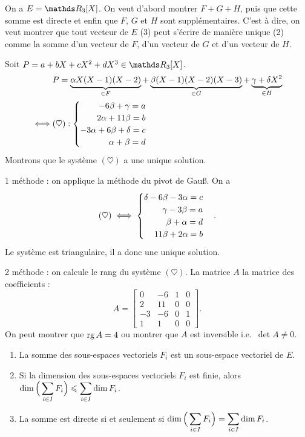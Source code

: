 \begin{exo}
	On a $E = \R_3[X]$. On veut d'abord montrer $F + G + H$, puis que cette somme est directe et enfin que $F$, $G$\/ et $H$\/ sont supplémentaires.
	C'est à dire, on veut montrer que tout vecteur de $E$\/ (3) peut s'écrire de manière unique (2) comme la somme d'un vecteur de $F$, d'un vecteur de $G$\/ et d'un vecteur de $H$.

	Soit $P = a + bX + cX^2 + dX^3 \in \R_3[X]$.
	\begin{align*}
		&P = \underbrace{\alpha X(X-1)(X-2)}_{\in F} + \underbrace{\beta (X-1)(X-2)(X-3)}_{\in G} + \underbrace{\gamma + \delta X^2}_{\in H}\\
		\iff& (\heartsuit) : \begin{cases}
			\hfill-6\beta + \gamma = a\\
			\hfill2\alpha + 11\beta = b\\
			\hfill-3\alpha + 6\beta + \delta = c\\
			\hfill\alpha + \beta = d\\
		\end{cases}
	\end{align*}
	Montrons que le système $(\heartsuit)$\/ a une unique solution.

	1 méthode : on applique la méthode du pivot de Gau\ss. On a \[
		(\heartsuit) \iff \begin{cases}
			\hfill \delta - 6 \beta - 3 \alpha = c\\
			\hfill \gamma - 3\beta = a\\
			\hfill \beta + \alpha = d\\
			\hfill 11\beta + 2\alpha = b
		\end{cases}
	.\]
	Le système est triangulaire, il a donc une unique solution.

	2 méthode : on calcule le rang du système $(\heartsuit)$. La matrice $A$\/ la matrice des coefficients : \[
		A = \begin{bmatrix}
			0&-6&1&0\\
			2&11&0&0\\
			-3&-6&0&1\\
			1&1&0&0
		\end{bmatrix}
	.\] On peut montrer que $\operatorname{rg} A = 4$\/ ou montrer que $A$\/ est inversible i.e.\ $\det A \neq 0$.
\end{exo}

\begin{prop}
	\begin{enumerate}
		\item La somme des sous-espaces vectoriels $F_i$\/ est un sous-espace vectoriel de $E$.
		\item Si la dimension des sous-espaces vectoriels $F_i$\/ est finie, alors $\displaystyle\dim\Big(\sum_{i \in I} F_i\Big) \leqslant \sum_{i \in I} \dim F_i$.
		\item La somme est directe si et seulement si $\displaystyle\dim\Big(\sum_{i \in I} F_i\Big) = \sum_{i \in I} \dim F_i$.
	\end{enumerate}
\end{prop}

